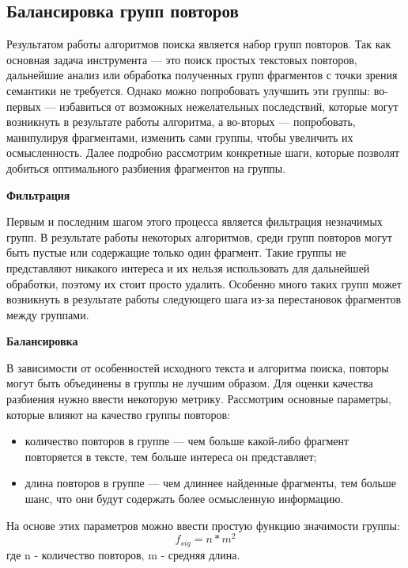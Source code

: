 \documentclass[14pt]{matmex-diploma-custom}
\begin{document}
\newpage
\subsection{Балансировка групп повторов}

Результатом работы алгоритмов поиска является набор групп повторов. Так как основная задача инструмента --- это поиск простых текстовых повторов, дальнейшие анализ или обработка полученных групп фрагментов с точки зрения семантики не требуется. Однако можно попробовать улучшить эти группы: во-первых --- избавиться от возможных нежелательных последствий, которые могут возникнуть в результате работы алгоритма, а во-вторых --- попробовать, манипулируя фрагментами, изменить сами группы, чтобы увеличить их осмысленность. Далее подробно рассмотрим конкретные шаги, которые позволят добиться оптимального разбиения фрагментов на группы.

\textbf{Фильтрация}

Первым и последним шагом этого процесса является фильтрация незначимых групп. В результате работы некоторых алгоритмов, среди групп повторов могут быть пустые или содержащие только один фрагмент. Такие группы не представляют никакого интереса и их нельзя использовать для дальнейшей обработки, поэтому их стоит просто удалить. Особенно много таких групп может возникнуть в результате работы следующего шага из-за перестановок фрагментов между группами.

\textbf{Балансировка}

В зависимости от особенностей исходного текста и алгоритма поиска, повторы могут быть объединены в группы не лучшим образом. Для оценки качества разбиения нужно ввести некоторую метрику. Рассмотрим основные параметры, которые влияют на качество группы повторов:

\begin{itemize}
	\item количество повторов в группе --- чем больше какой-либо фрагмент повторяется в тексте, тем больше интереса он представляет;
	\item длина повторов в группе --- чем длиннее найденные фрагменты, тем больше шанс, что они будут содержать более осмысленную информацию.
\end{itemize}

На основе этих параметров можно ввести простую функцию значимости группы:
\begin{equation}
	f_{sig} = n * m^2
\end{equation}
где n - количество повторов, m - средняя длина.
\end{document}

